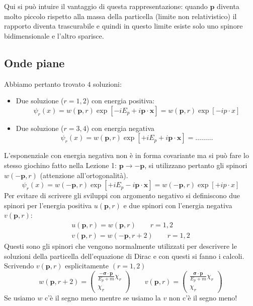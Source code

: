 Qui si può intuire il vantaggio di questa rappresentazione: quando $\mathbf{p}$ diventa molto piccolo rispetto alla massa della particella (limite non relativistico) il rapporto diventa trascurabile e quindi in questo limite esiste solo uno spinore bidimensionale e l'altro sparisce. 
\subsection{Onde piane}
Abbiamo pertanto trovato $4$ soluzioni:
\begin{itemize}
    \item Due soluzione ($r=1,2$) con energia positiva:
$$
\psi_r(x) = w(\mathbf{p}, r) \exp[-iE_p + i\mathbf{p} \cdot \mathbf{x}] = w(\mathbf{p}, r) \exp[-ip \cdot x]
$$
\item Due soluzione ($r=3,4$) con energia negativa
$$
\psi_r(x) = w(\mathbf{p}, r) \exp[+iE_p + i\mathbf{p} \cdot \mathbf{x}] = \dots\dots\dots
$$
\end{itemize}
L'esponenziale con energia negativa non è in forma covariante ma si può fare lo stesso giochino fatto nella Lezione 1: $\mathbf{p}\to-\mathbf{p}$, si utilizzano pertanto gli spinori $w(-\mathbf{p},r)$ (attenzione all'ortogonalità).
$$
\psi_r(x) = w(-\mathbf{p}, r) \exp[+iE_p - i\mathbf{p} \cdot \mathbf{x}] = w(-\mathbf{p}, r) \exp[+ip \cdot x]
$$
Per evitare di scrivere gli sviluppi con argomento negativo si definiscono due spinori per l'energia positiva $u(\mathbf{p},r)$ e due spinori con l'energia negativa $v(\mathbf{p},r)$:
\begin{align*}
    u(\mathbf{p}, r) = w(\mathbf{p}, r) \qquad r=1,2 \\
    v(\mathbf{p}, r) = w(-\mathbf{p}, r+2) \qquad r=1,2
\end{align*}
Questi sono gli spinori che vengono normalmente utilizzati per descrivere le soluzioni della particella dell'equazione di Dirac e con questi si fanno i calcoli. Scrivendo $v(\mathbf{p},r)$ esplicitamente $(r=1,2)$
$$
w(\mathbf{p}, r+2) = \begin{pmatrix} \frac{-\boldsymbol{\sigma} \cdot \mathbf{p}}{E_p + m} \chi_r \\ \chi_r \end{pmatrix} \qquad v(\mathbf{p}, r) = \begin{pmatrix} \frac{\boldsymbol{\sigma} \cdot \mathbf{p}}{E_p + m} \chi_r \\ \chi_r \end{pmatrix}
$$
Se usiamo $w$ c'è il segno meno mentre se usiamo la $v$ non c'è il segno meno!
